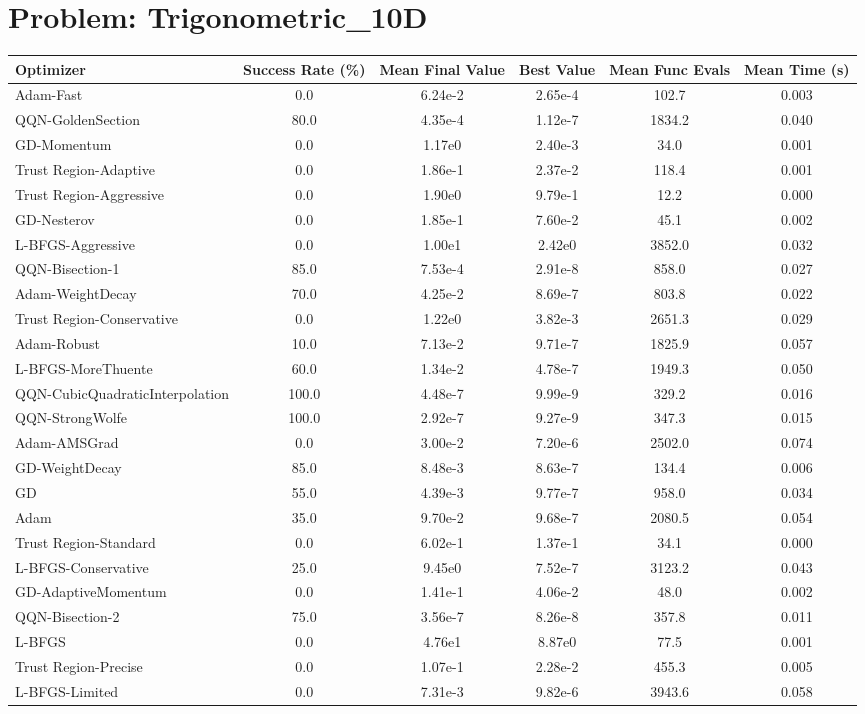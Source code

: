 \documentclass{article}
\begin{document}
\section{Problem: Trigonometric\_10D}
\begin{longtable}{p{3cm}*{5}{c}}
\toprule
\textbf{Optimizer} & \textbf{Success Rate (\%)} & \textbf{Mean Final Value} & \textbf{Best Value} & \textbf{Mean Func Evals} & \textbf{Mean Time (s)} \\
\midrule
Adam-Fast & 0.0 & 6.24e-2 & 2.65e-4 & 102.7 & 0.003 \\
QQN-GoldenSection & 80.0 & 4.35e-4 & 1.12e-7 & 1834.2 & 0.040 \\
GD-Momentum & 0.0 & 1.17e0 & 2.40e-3 & 34.0 & 0.001 \\
Trust Region-Adaptive & 0.0 & 1.86e-1 & 2.37e-2 & 118.4 & 0.001 \\
Trust Region-Aggressive & 0.0 & 1.90e0 & 9.79e-1 & 12.2 & 0.000 \\
GD-Nesterov & 0.0 & 1.85e-1 & 7.60e-2 & 45.1 & 0.002 \\
L-BFGS-Aggressive & 0.0 & 1.00e1 & 2.42e0 & 3852.0 & 0.032 \\
QQN-Bisection-1 & 85.0 & 7.53e-4 & 2.91e-8 & 858.0 & 0.027 \\
Adam-WeightDecay & 70.0 & 4.25e-2 & 8.69e-7 & 803.8 & 0.022 \\
Trust Region-Conservative & 0.0 & 1.22e0 & 3.82e-3 & 2651.3 & 0.029 \\
Adam-Robust & 10.0 & 7.13e-2 & 9.71e-7 & 1825.9 & 0.057 \\
L-BFGS-MoreThuente & 60.0 & 1.34e-2 & 4.78e-7 & 1949.3 & 0.050 \\
QQN-CubicQuadraticInterpolation & 100.0 & 4.48e-7 & 9.99e-9 & 329.2 & 0.016 \\
QQN-StrongWolfe & 100.0 & 2.92e-7 & 9.27e-9 & 347.3 & 0.015 \\
Adam-AMSGrad & 0.0 & 3.00e-2 & 7.20e-6 & 2502.0 & 0.074 \\
GD-WeightDecay & 85.0 & 8.48e-3 & 8.63e-7 & 134.4 & 0.006 \\
GD & 55.0 & 4.39e-3 & 9.77e-7 & 958.0 & 0.034 \\
Adam & 35.0 & 9.70e-2 & 9.68e-7 & 2080.5 & 0.054 \\
Trust Region-Standard & 0.0 & 6.02e-1 & 1.37e-1 & 34.1 & 0.000 \\
L-BFGS-Conservative & 25.0 & 9.45e0 & 7.52e-7 & 3123.2 & 0.043 \\
GD-AdaptiveMomentum & 0.0 & 1.41e-1 & 4.06e-2 & 48.0 & 0.002 \\
QQN-Bisection-2 & 75.0 & 3.56e-7 & 8.26e-8 & 357.8 & 0.011 \\
L-BFGS & 0.0 & 4.76e1 & 8.87e0 & 77.5 & 0.001 \\
Trust Region-Precise & 0.0 & 1.07e-1 & 2.28e-2 & 455.3 & 0.005 \\
L-BFGS-Limited & 0.0 & 7.31e-3 & 9.82e-6 & 3943.6 & 0.058 \\
\bottomrule
\end{longtable}
\end{document}
